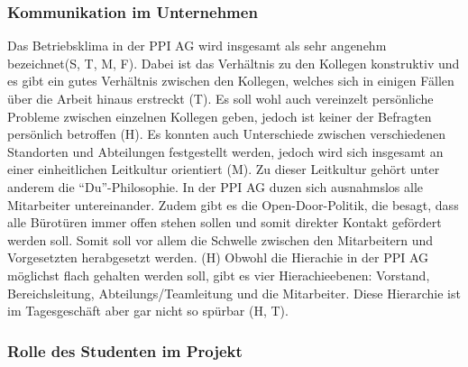 \documentclass[
  12pt,
  ngerman,
  a4paper,
]{article}
\begin{document}
\hypertarget{kommunikation-im-unternehmen}{%
\subsubsection{Kommunikation im
Unternehmen}\label{kommunikation-im-unternehmen}}

Das Betriebsklima in der PPI AG wird insgesamt als sehr angenehm
bezeichnet(S, T, M, F). Dabei ist das Verhältnis zu den Kollegen
konstruktiv und es gibt ein gutes Verhältnis zwischen den Kollegen,
welches sich in einigen Fällen über die Arbeit hinaus erstreckt (T). Es
soll wohl auch vereinzelt persönliche Probleme zwischen einzelnen
Kollegen geben, jedoch ist keiner der Befragten persönlich betroffen
(H). Es konnten auch Unterschiede zwischen verschiedenen Standorten und
Abteilungen festgestellt werden, jedoch wird sich insgesamt an einer
einheitlichen Leitkultur orientiert (M). Zu dieser Leitkultur gehört
unter anderem die ``Du''-Philosophie. In der PPI AG duzen sich
ausnahmslos alle Mitarbeiter untereinander. Zudem gibt es die
Open-Door-Politik, die besagt, dass alle Bürotüren immer offen stehen
sollen und somit direkter Kontakt gefördert werden soll. Somit soll vor
allem die Schwelle zwischen den Mitarbeitern und Vorgesetzten
herabgesetzt werden. (H) Obwohl die Hierachie in der PPI AG möglichst
flach gehalten werden soll, gibt es vier Hierachieebenen: Vorstand,
Bereichsleitung, Abteilungs/Teamleitung und die Mitarbeiter. Diese
Hierarchie ist im Tagesgeschäft aber gar nicht so spürbar (H, T).

\hypertarget{rolle-des-studenten-im-projekt}{%
\subsubsection{Rolle des Studenten im
Projekt}\label{rolle-des-studenten-im-projekt}}
\end{document}
